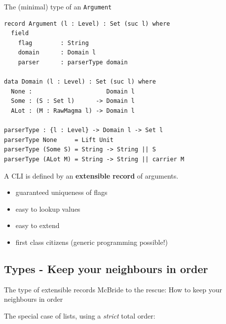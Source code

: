 \documentclass[dvipsnames]{beamer}
\begin{document}
\begin{frame}[fragile]{The (minimal) type of an \texttt{Argument}}
\begin{verbatim}
record Argument (l : Level) : Set (suc l) where
  field
    flag        : String
    domain      : Domain l
    parser      : parserType domain

data Domain (l : Level) : Set (suc l) where
  None :                     Domain l
  Some : (S : Set l)      -> Domain l
  ALot : (M : RawMagma l) -> Domain l

parserType : {l : Level} -> Domain l -> Set l
parserType None     = Lift Unit
parserType (Some S) = String -> String || S
parserType (ALot M) = String -> String || carrier M
\end{verbatim}
\end{frame}

\begin{frame}[fragile]
  A CLI is defined by an \textbf{extensible record} of arguments.

  \begin{itemize}
    \item guaranteed uniqueness of flags
    \item easy to lookup values
    \item easy to extend
    \item first class citizens (generic programming possible!)
  \end{itemize}
\end{frame}

\subsection{Types - Keep your neighbours in order}

\begin{frame}{The type of extensible records}
  McBride to the rescue: How to keep your neighbours in order

  The special case of lists, using a \emph{strict} total order:
\begin{figure}[t]
\centering
{}
\end{figure}

\end{frame}
\end{document}
